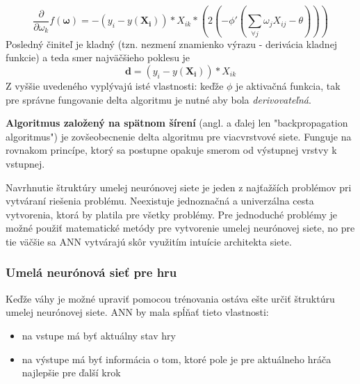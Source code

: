 \begin{equation}
    \frac{\partial}{\partial \omega_k}f(\pmb{\omega})=-(y_i-y(\mathbf{X_i}))*X_{ik}*(2(-\phi'(\sum_{\forall j}{\omega_j X_{ij}-\theta})))
\end{equation}
Posledný činiteľ je kladný (tzn. nezmení znamienko výrazu - derivácia kladnej funkcie) a teda smer najväčšieho poklesu
je
\begin{equation}
    \pmb{d}=(y_i-y(\mathbf{X_i}))*X_{ik}
\end{equation}
Z vyššie uvedeného vyplývajú isté vlastnosti: keďže $\phi$ je aktivačná funkcia, tak pre správne fungovanie delta
algoritmu je nutné aby bola \emph{derivovateľná}.

\textbf{Algoritmus založený na spätnom šírení} (angl. a ďalej len "backpropagation algoritmus") je zovšeobecnenie delta
algoritmu pre viacvrstvové siete.
Funguje na rovnakom princípe, ktorý sa postupne opakuje smerom od výstupnej vrstvy k vstupnej.

Navrhnutie štruktúry umelej neurónovej siete je jeden z najťažších problémov pri vytváraní riešenia problému.
Neexistuje jednoznačná a univerzálna cesta vytvorenia, ktorá by platila pre všetky problémy.
Pre jednoduché problémy je možné použiť matematické metódy pre vytvorenie umelej neurónovej siete, no pre tie väčšie
sa ANN vytvárajú skôr využitím intuície architekta siete.

\subsubsection{Umelá neurónová sieť pre hru}

Keďže váhy je možné upraviť pomocou trénovania ostáva ešte určiť štruktúru umelej neurónovej siete.
ANN by mala spĺňať tieto vlastnosti:
\begin{itemize}
    \item na vstupe má byť aktuálny stav hry
    \item na výstupe má byť informácia o tom, ktoré pole je pre aktuálneho hráča najlepšie pre ďalší krok
\end{itemize}


